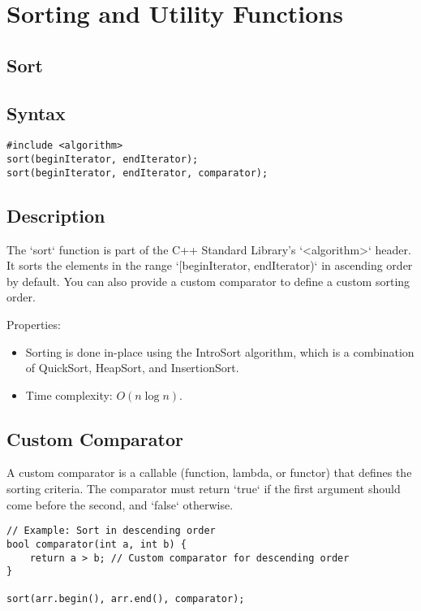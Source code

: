 \documentclass{article}
\begin{document}
\newpage
\section{Sorting and Utility Functions}

\subsection{Sort}

\subsection{Syntax}

\begin{lstlisting}
#include <algorithm>
sort(beginIterator, endIterator);
sort(beginIterator, endIterator, comparator);
\end{lstlisting}

\subsection{Description}

The `sort` function is part of the C++ Standard Library's `<algorithm>` header. It sorts the elements in the range `[beginIterator, endIterator)` in ascending order by default. You can also provide a custom comparator to define a custom sorting order.

\noindent Properties:
\begin{itemize}
    \item Sorting is done in-place using the IntroSort algorithm, which is a combination of QuickSort, HeapSort, and InsertionSort.
    \item Time complexity: \(O(n \log n)\).
\end{itemize}

\subsection{Custom Comparator}

A custom comparator is a callable (function, lambda, or functor) that defines the sorting criteria. The comparator must return `true` if the first argument should come before the second, and `false` otherwise.

\begin{lstlisting}
// Example: Sort in descending order
bool comparator(int a, int b) {
    return a > b; // Custom comparator for descending order
}

sort(arr.begin(), arr.end(), comparator);
\end{lstlisting}
\end{document}
